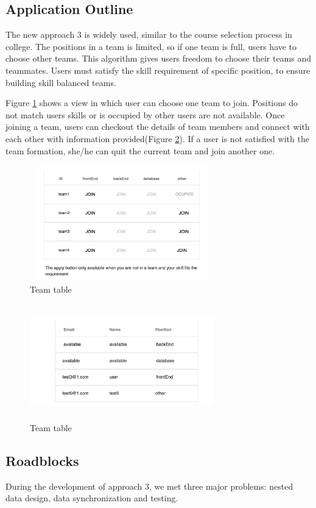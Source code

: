 \documentclass[conference]{IEEEtran}
\begin{document}
\subsection{Application Outline}
The new approach 3 is widely used, similar to the course selection process in college. The positions in a team is limited, so if one team is full, users have to choose other teams. This algorithm gives users freedom to choose their teams and teammates. Users must satisfy the skill requirement of specific position, to ensure building skill balanced teams.

Figure \ref{teams} shows a view in which user can choose one team to join. Positions do not match users skills or is occupied by other users are not available. Once joining a team, users can checkout the details of team members and connect with each other with information provided(Figure \ref{team_info}). If a user is not satisfied with the team formation, she/he can quit the current team and join another one.

\begin{figure}[H]
  \includegraphics[width=8cm,height=5cm]{image/app3-teams.png}
  \caption{Team table}
  \label{teams}
\end{figure}
\begin{figure}[H]
  \includegraphics[width=8cm,height=5cm]{image/app3-teaminfo.png}
  \caption{Team table}
  \label{team_info}
\end{figure}

\subsection{Roadblocks}
During the development of approach 3, we met three major problems: nested data design, data synchronization and testing.
\end{document}
